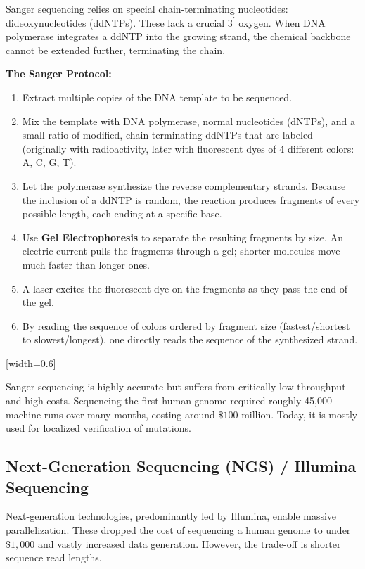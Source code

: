 Sanger sequencing relies on special chain-terminating nucleotides: dideoxynucleotides (ddNTPs). These lack a crucial $3^{\prime}$ oxygen. When DNA polymerase integrates a ddNTP into the growing strand, the chemical backbone cannot be extended further, terminating the chain.

\textbf{The Sanger Protocol:}
\begin{enumerate}
  \item Extract multiple copies of the DNA template to be sequenced.
  \item Mix the template with DNA polymerase, normal nucleotides (dNTPs), and a small ratio of modified, chain-terminating ddNTPs that are labeled (originally with radioactivity, later with fluorescent dyes of 4 different colors: A, C, G, T).
  \item Let the polymerase synthesize the reverse complementary strands. Because the inclusion of a ddNTP is random, the reaction produces fragments of every possible length, each ending at a specific base.
  \item Use \textbf{Gel Electrophoresis} to separate the resulting fragments by size. An electric current pulls the fragments through a gel; shorter molecules move much faster than longer ones.
  \item A laser excites the fluorescent dye on the fragments as they pass the end of the gel.
  \item By reading the sequence of colors ordered by fragment size (fastest/shortest to slowest/longest), one directly reads the sequence of the synthesized strand.
\end{enumerate}

[width=0.6\textwidth]

Sanger sequencing is highly accurate but suffers from critically low throughput and high costs. Sequencing the first human genome required roughly 45,000 machine runs over many months, costing around $\$100$ million. Today, it is mostly used for localized verification of mutations.

\subsection{Next-Generation Sequencing (NGS) / Illumina Sequencing}
Next-generation technologies, predominantly led by Illumina, enable massive parallelization. These dropped the cost of sequencing a human genome to under $\$1,000$ and vastly increased data generation. However, the trade-off is shorter sequence read lengths.

